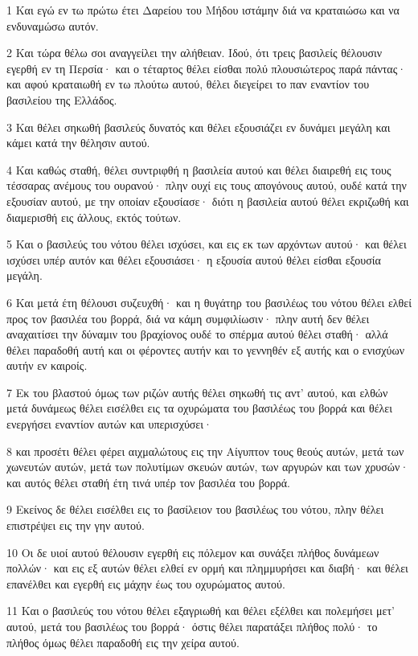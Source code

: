 \par 1 Και εγώ εν τω πρώτω έτει Δαρείου του Μήδου ιστάμην διά να κραταιώσω και να ενδυναμώσω αυτόν.
\par 2 Και τώρα θέλω σοι αναγγείλει την αλήθειαν. Ιδού, ότι τρεις βασιλείς θέλουσιν εγερθή εν τη Περσία· και ο τέταρτος θέλει είσθαι πολύ πλουσιώτερος παρά πάντας· και αφού κραταιωθή εν τω πλούτω αυτού, θέλει διεγείρει το παν εναντίον του βασιλείου της Ελλάδος.
\par 3 Και θέλει σηκωθή βασιλεύς δυνατός και θέλει εξουσιάζει εν δυνάμει μεγάλη και κάμει κατά την θέλησιν αυτού.
\par 4 Και καθώς σταθή, θέλει συντριφθή η βασιλεία αυτού και θέλει διαιρεθή εις τους τέσσαρας ανέμους του ουρανού· πλην ουχί εις τους απογόνους αυτού, ουδέ κατά την εξουσίαν αυτού, με την οποίαν εξουσίασε· διότι η βασιλεία αυτού θέλει εκριζωθή και διαμερισθή εις άλλους, εκτός τούτων.
\par 5 Και ο βασιλεύς του νότου θέλει ισχύσει, και εις εκ των αρχόντων αυτού· και θέλει ισχύσει υπέρ αυτόν και θέλει εξουσιάσει· η εξουσία αυτού θέλει είσθαι εξουσία μεγάλη.
\par 6 Και μετά έτη θέλουσι συζευχθή· και η θυγάτηρ του βασιλέως του νότου θέλει ελθεί προς τον βασιλέα του βορρά, διά να κάμη συμφιλίωσιν· πλην αυτή δεν θέλει αναχαιτίσει την δύναμιν του βραχίονος ουδέ το σπέρμα αυτού θέλει σταθή· αλλά θέλει παραδοθή αυτή και οι φέροντες αυτήν και το γεννηθέν εξ αυτής και ο ενισχύων αυτήν εν καιροίς.
\par 7 Εκ του βλαστού όμως των ριζών αυτής θέλει σηκωθή τις αντ' αυτού, και ελθών μετά δυνάμεως θέλει εισέλθει εις τα οχυρώματα του βασιλέως του βορρά και θέλει ενεργήσει εναντίον αυτών και υπερισχύσει·
\par 8 και προσέτι θέλει φέρει αιχμαλώτους εις την Αίγυπτον τους θεούς αυτών, μετά των χωνευτών αυτών, μετά των πολυτίμων σκευών αυτών, των αργυρών και των χρυσών· και αυτός θέλει σταθή έτη τινά υπέρ τον βασιλέα του βορρά.
\par 9 Εκείνος δε θέλει εισέλθει εις το βασίλειον του βασιλέως του νότου, πλην θέλει επιστρέψει εις την γην αυτού.
\par 10 Οι δε υιοί αυτού θέλουσιν εγερθή εις πόλεμον και συνάξει πλήθος δυνάμεων πολλών· και εις εξ αυτών θέλει ελθεί εν ορμή και πλημμυρήσει και διαβή· και θέλει επανέλθει και εγερθή εις μάχην έως του οχυρώματος αυτού.
\par 11 Και ο βασιλεύς του νότου θέλει εξαγριωθή και θέλει εξέλθει και πολεμήσει μετ' αυτού, μετά του βασιλέως του βορρά· όστις θέλει παρατάξει πλήθος πολύ· το πλήθος όμως θέλει παραδοθή εις την χείρα αυτού.
